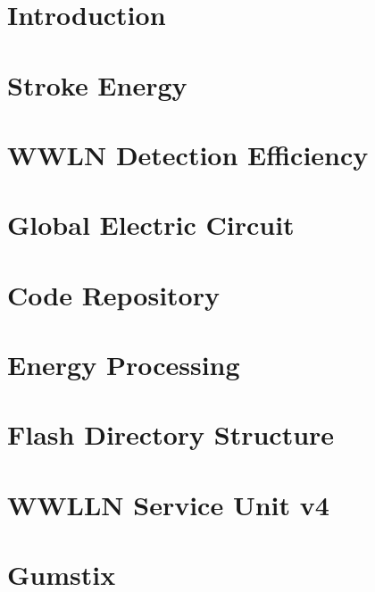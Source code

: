 \documentclass [11pt, twoside] {uwthesis}[2012/06/19]
\begin{document}
 
\chapter{Introduction}
 
 
\chapter{Stroke Energy}




\chapter{WWLN Detection Efficiency}



 
\chapter{Global Electric Circuit}



%
%





%
%

\appendix
\raggedbottom\sloppy
 

\chapter{Code Repository}



\chapter{Energy Processing}



\chapter{Flash Directory Structure}



\chapter{WWLLN Service Unit v4}



\chapter{Gumstix}



\end{document}
